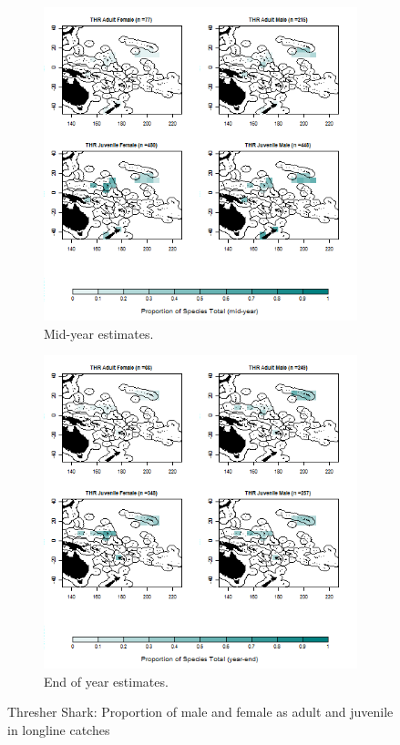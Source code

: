 \documentclass[12pt]{SCreport}
\begin{document}
\begin{landscape}
\begin{figure}
\centering
   \begin{subfigure}[b]{0.6\textwidth}
       \includegraphics[width=\textwidth]{../GRAPHICS/Map_maturity_sex_THR_MY}
       \caption{Mid-year estimates.}
       \label{fig:test1}
   \end{subfigure}
   \begin{subfigure}[b]{0.6\textwidth}
       \includegraphics[width=\textwidth]{../GRAPHICS/Map_maturity_sex_THR}
       \caption{End of year estimates.}
       \label{fig:test2}
   \end{subfigure}
\caption{Thresher Shark: Proportion of male and female as adult and juvenile in longline catches }
\label{fig:test} 
\end{figure}
\end{landscape}
\end{document}
